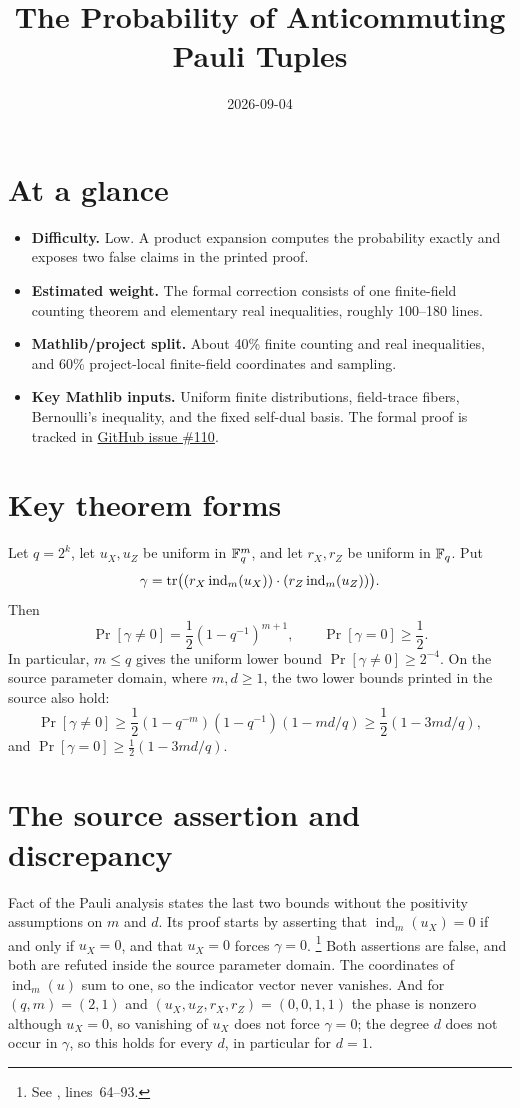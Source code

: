 \documentclass[11pt]{article}
\title{The Probability of Anticommuting Pauli Tuples}
\author{}
\date{2026-09-04}
\newcommand{\ind}{\operatorname{ind}}
\renewcommand{\ghissue}[1]{%
  \href{https://github.com/Dengnifer/MIPStarRE-QPBT/issues/#1}{GitHub issue \##1}}
\begin{document}
\maketitle

\section{At a glance}

\begin{itemize}
  \item \textbf{Difficulty.} Low.  A product expansion computes the
  probability exactly and exposes two false claims in the printed proof.
  \item \textbf{Estimated weight.} The formal correction consists of one
  finite-field counting theorem and elementary real inequalities, roughly
  100--180 lines.
  \item \textbf{Mathlib/project split.} About 40\% finite counting and real
  inequalities, and 60\% project-local finite-field coordinates and sampling.
  \item \textbf{Key Mathlib inputs.} Uniform finite distributions, field-trace
  fibers, Bernoulli's inequality, and the fixed self-dual basis.  The formal
  proof is tracked in \ghissue{110}.
\end{itemize}

\section{Key theorem forms}

Let $q=2^k$, let $u_X,u_Z$ be uniform in $\mathbb{F}_q^m$, and let $r_X,r_Z$ be
uniform in $\mathbb{F}_q$.  Put
\[
  \gamma=\tr\big((r_X\ind_m(u_X))\cdot(r_Z\ind_m(u_Z))\big).
\]
Then
\[
  \Pr[\gamma\ne0]=\frac12(1-q^{-1})^{m+1},
  \qquad
  \Pr[\gamma=0]\geq\frac12.
\]
In particular, $m\leq q$ gives the uniform lower bound
$\Pr[\gamma\ne0]\geq2^{-4}$.  On the source parameter domain, where
$m,d\geq1$, the two lower bounds printed in the source also hold:
\[
  \Pr[\gamma\ne0]
  \geq \frac12(1-q^{-m})(1-q^{-1})(1-md/q)
  \geq \frac12(1-3md/q),
\]
and $\Pr[\gamma=0]\geq\frac12(1-3md/q)$.

\section{The source assertion and discrepancy}

Fact  of the Pauli analysis
\cite[lines~64--93]{Ji2020MIPStar} states the last two bounds without the
positivity assumptions on $m$ and $d$.  Its proof starts by
asserting that $\ind_m(u_X)=0$ if and only if $u_X=0$, and that $u_X=0$ forces
$\gamma=0$.%
\footnote{See
,
lines~64--93.}
Both assertions are false, and both are refuted inside the source parameter
domain.  The coordinates of $\ind_m(u)$ sum to one, so the indicator vector
never vanishes.  And for $(q,m)=(2,1)$ and $(u_X,u_Z,r_X,r_Z)=(0,0,1,1)$ the
phase is nonzero although $u_X=0$, so vanishing of $u_X$ does not force
$\gamma=0$; the degree $d$ does not occur in $\gamma$, so this holds for every
$d$, in particular for $d=1$.
\end{document}

